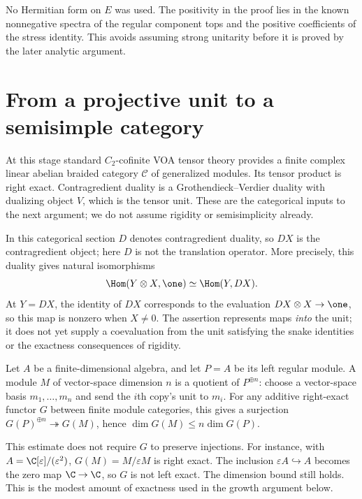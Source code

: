 No Hermitian form on $E$ was used. The positivity in the proof lies
in the known nonnegative spectra of the regular component tops and
the positive coefficients of the stress identity. This avoids
assuming strong unitarity before it is proved by the later analytic
argument.

\section{From a projective unit to a semisimple category}

At this stage standard $C_2$-cofinite VOA tensor theory provides a
finite complex linear abelian braided category $\mathcal C$ of
generalized modules. Its tensor product is right exact. Contragredient
duality is a Grothendieck--Verdier duality with dualizing object $V$,
which is the tensor unit. These are the categorical inputs to the
next argument; we do not assume rigidity or semisimplicity already.

In this categorical section $D$ denotes contragredient duality, so $DX$
is the contragredient object; here $D$ is not the translation operator.
More precisely, this duality gives natural isomorphisms
\[
 \Hom(Y\otimes X,\one)\simeq\Hom(Y,DX).
\]
At $Y=DX$, the identity of $DX$ corresponds to the evaluation
$DX\otimes X\to\one$, so this map is nonzero when $X\ne0$.
The assertion represents maps \emph{into} the unit; it does not yet
supply a coevaluation from the unit satisfying the snake identities
or the exactness consequences of rigidity.

\begin{example}
Let $A$ be a finite-dimensional algebra, and let $P=A$ be its
left regular module. A module $M$ of vector-space dimension $n$
is a quotient of $P^{\oplus n}$: choose a vector-space basis
$m_1,\ldots,m_n$ and send the $i$th copy's unit to $m_i$.
For any additive right-exact functor $G$ between finite module
categories, this gives a surjection
$G(P)^{\oplus n}\twoheadrightarrow G(M)$, hence
$\dim G(M)\leq n\dim G(P)$.

This estimate does not require $G$ to preserve injections.
For instance, with $A=\C[\varepsilon]/(\varepsilon^2)$,
$G(M)=M/\varepsilon M$ is right exact. The inclusion
$\varepsilon A\hookrightarrow A$ becomes the zero map
$\C\to\C$, so $G$ is not left exact. The dimension bound
still holds. This is the modest amount of exactness used in
the growth argument below.
\end{example}

